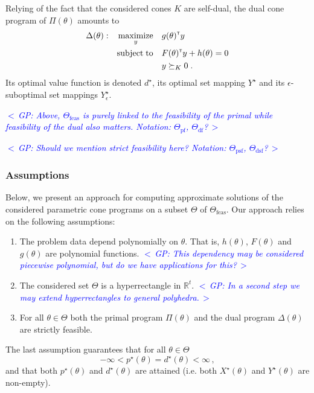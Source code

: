 \documentclass{article}
\newcommand{\R}{\mathbb{R}}        %
\renewcommand{\t}{^{\mbox{\tiny \sf T}}}    %
\newcommand{\ppar}{\theta}                  %
\newcommand{\Ppar}{\Theta}                  %
\DeclareMathOperator*{\maximize}{maximize}
\DeclareMathOperator*{\subj}{subject\;to}
\newcommand{\commentGP}[1]{\noindent \textcolor{blue}{\emph{$<\,$GP: #1$\,>$}}}%
\begin{document}
Relying of the fact that the considered cones $K$ are self-dual, the dual cone program of $\Pi(\ppar)$ amounts to
\begin{gather}\label{eq:parametric_dual}
\begin{aligned}
\Delta(\ppar): && \maximize_{y} &&& g(\ppar)\t y\\
                && \subj         &&& F(\ppar)\t y + h(\ppar)= 0\\
                &&               &&& y \succeq_K 0  \;.
\end{aligned}
\end{gather}
Its optimal value function is denoted $d^\star$, its optimal set mapping $Y^\star$ and its $\epsilon$-suboptimal set mappings $Y^\star_\epsilon$.

\commentGP{Above, $\Ppar_\text{feas}$ is purely linked to the feasibility of the primal while feasibility of the dual also matters. Notation: $\Ppar_{\text{pf}}$, $\Ppar_{\text{df}}$?}

\commentGP{Should we mention strict feasibility here? Notation: $\Ppar_{\text{psf}}$, $\Ppar_{\text{dsf}}$?}


\subsubsection*{Assumptions}

Below, we present an approach for computing approximate solutions of the considered parametric cone programs on a subset $\Ppar$ of $\Ppar_\text{feas}$. Our approach relies on the following assumptions:

\begin{enumerate}[\bf\text{A}1.]
\item\label{ass_pdep} The problem data depend polynomially on $\ppar$. That is, $h(\ppar)$, $F(\ppar)$ and $g(\ppar)$ are polynomial functions. \commentGP{This dependency may be considered piecewise polynomial, but do we have applications for this?}
\item\label{ass_Ppar} The considered set $\Ppar$ is a hyperrectangle in $\R^t$. \commentGP{In a second step we may extend hyperrectangles to general polyhedra.}
\item\label{ass_feas} For all $\ppar\in\Ppar$ both the primal program $\Pi(\ppar)$ and the dual program $\Delta(\ppar)$ are strictly feasible.
\end{enumerate}
The last assumption guarantees that for all $\ppar\in\Ppar$
\[ -\infty < p^\star(\ppar) = d^\star(\ppar) < \infty \,,%
\]
and that both $p^\star(\ppar)$ and $d^\star(\ppar)$ are attained (i.e. both $X^\star(\ppar)$ and $Y^\star(\ppar)$ are non-empty).
\end{document}
